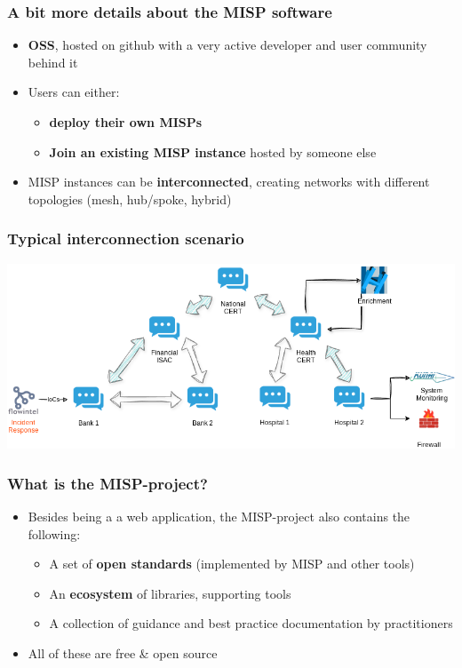 \begin{frame}
\frametitle{A bit more details about the MISP software}      
\begin{itemize}
       \item {\bf OSS}, hosted on github with a very active developer and user community behind it
       \item Users can either: 
       \begin{itemize}
           \item {\bf deploy their own MISPs}
           \item {\bf Join an existing MISP instance} hosted by someone else
       \end{itemize}
       \item MISP instances can be {\bf interconnected}, creating networks with different topologies (mesh, hub/spoke, hybrid)
\end{itemize}
\end{frame}

\begin{frame}
    \frametitle{Typical interconnection scenario}
    \begin{center}
        \includegraphics[width=1\linewidth]{MISP_community.png}
    \end{center}   
\end{frame}

\begin{frame}
\frametitle{What is the MISP-project?}
\begin{itemize}
        \item Besides being a a web application, the MISP-project also contains the following:
        \begin{itemize}
            \item A set of {\bf open standards} (implemented by MISP and other tools)
            \item An {\bf ecosystem} of libraries, supporting tools
            \item A collection of guidance and best practice documentation by practitioners
        \end{itemize}
        \item All of these are free \& open source
\end{itemize}
\end{frame}

